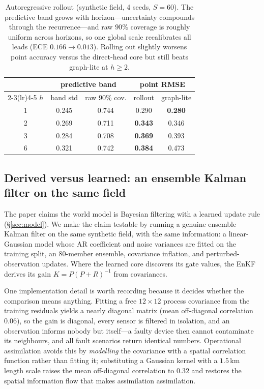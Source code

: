 \documentclass[10pt]{article}
\begin{document}
\begin{table}[t]
\centering
\small
\begin{tabular}{@{}c cc cc@{}}
\toprule
& \multicolumn{2}{c}{predictive band} & \multicolumn{2}{c}{point RMSE} \\
\cmidrule(lr){2-3}\cmidrule(lr){4-5}
$h$ & band std & raw 90\% cov. & rollout & graph-lite \\
\midrule
1 & 0.245 & 0.744 & 0.290 & \textbf{0.280} \\
2 & 0.269 & 0.711 & \textbf{0.343} & 0.346 \\
3 & 0.284 & 0.708 & \textbf{0.369} & 0.393 \\
6 & 0.321 & 0.742 & \textbf{0.384} & 0.473 \\
\bottomrule
\end{tabular}
\caption{Autoregressive rollout (synthetic field, 4 seeds, $S=60$). The predictive
band grows with horizon---uncertainty compounds through the recurrence---and raw
$90\%$ coverage is roughly uniform across horizons, so one global scale recalibrates
all leads (ECE $0.166\!\to\!0.013$). Rolling out slightly worsens point accuracy
versus the direct-head core but still beats graph-lite at $h\geq2$.}
\label{tab:rollout}
\end{table}

\subsection{Derived versus learned: an ensemble Kalman filter on the same field}
\label{sec:enkf}
The paper claims the world model is Bayesian filtering with a learned update rule
(\S\ref{sec:model}). We make the claim testable by running a genuine ensemble
Kalman filter on the same synthetic field, with the same information: a
linear-Gaussian model whose AR coefficient and noise variances are fitted on the
training split, an $80$-member ensemble, covariance inflation, and perturbed-observation
updates. Where the learned core discovers its gate values, the EnKF derives its
gain $K=P(P+R)^{-1}$ from covariances.

One implementation detail is worth recording because it decides whether the
comparison means anything. Fitting a free $12\times12$ process covariance from the
training residuals yields a nearly diagonal matrix (mean off-diagonal correlation
$0.06$), so the gain is diagonal, every sensor is filtered in isolation, and an
observation informs nobody but itself---a faulty device then cannot contaminate its
neighbours, and all fault scenarios return identical numbers. Operational
assimilation avoids this by \emph{modelling} the covariance with a spatial
correlation function rather than fitting it; substituting a Gaussian kernel with a
$1.5$\,km length scale raises the mean off-diagonal correlation to $0.32$ and
restores the spatial information flow that makes assimilation assimilation.
\end{document}
